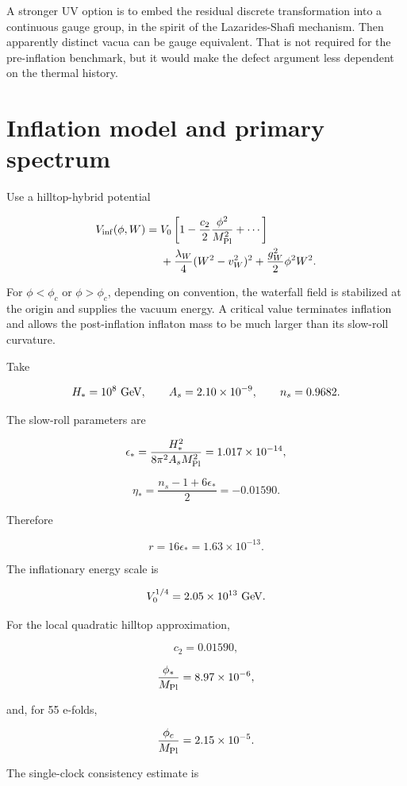 \documentclass[
  10pt,
]{article}
\begin{document}
A stronger UV option is to embed the residual discrete transformation
into a continuous gauge group, in the spirit of the Lazarides-Shafi
mechanism. Then apparently distinct vacua can be gauge equivalent. That
is not required for the pre-inflation benchmark, but it would make the
defect argument less dependent on the thermal history.

\section{Inflation model and primary
spectrum}\label{inflation-model-and-primary-spectrum}

Use a hilltop-hybrid potential

\[
\begin{aligned}
V_{\rm inf}(\phi,W)
={}&
V_0
\left[
1-\frac{c_2}{2}\frac{\phi^2}{M_{\rm Pl}^2}
+\cdots
\right]
\\
&+
\frac{\lambda_W}{4}(W^2-v_W^2)^2
+
\frac{g_W^2}{2}\phi^2W^2.
\end{aligned}
\]

For \(\phi<\phi_c\) or \(\phi>\phi_c\), depending on convention, the
waterfall field is stabilized at the origin and supplies the vacuum
energy. A critical value terminates inflation and allows the
post-inflation inflaton mass to be much larger than its slow-roll
curvature.

Take

\[
H_*=10^8\ {\rm GeV},
\qquad
A_s=2.10\times10^{-9},
\qquad
n_s=0.9682.
\]

The slow-roll parameters are

\[
\epsilon_*
=
\frac{H_*^2}{8\pi^2A_sM_{\rm Pl}^2}
=1.017\times10^{-14},
\]

\[
\eta_*
=
\frac{n_s-1+6\epsilon_*}{2}
=-0.01590.
\]

Therefore

\[
\boxed{
r=16\epsilon_*=1.63\times10^{-13}.}
\]

The inflationary energy scale is

\[
V_0^{1/4}
=
2.05\times10^{13}\ {\rm GeV}.
\]

For the local quadratic hilltop approximation,

\[
c_2=0.01590,
\]

\[
\frac{\phi_*}{M_{\rm Pl}}
=8.97\times10^{-6},
\]

and, for 55 e-folds,

\[
\frac{\phi_c}{M_{\rm Pl}}
=2.15\times10^{-5}.
\]

The single-clock consistency estimate is
\end{document}
